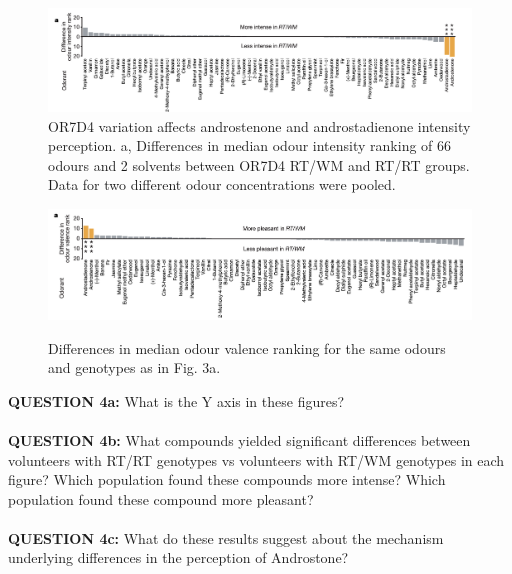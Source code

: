 \documentclass{article}
\begin{document}
\renewcommand{\thefigure}{3a}
\begin{figure}[h]
\hspace*{-3.5cm} 
\includegraphics[scale =.55]{3}\\
\caption{OR7D4 variation affects androstenone and androstadienone intensity perception. a, Differences in median odour intensity ranking of 66 odours and 2 solvents between OR7D4 RT/WM and RT/RT groups. Data for two different odour concentrations were pooled. }
\renewcommand{\thefigure}{4a}
\hspace*{-3.5cm} 
\includegraphics[scale =.55]{5}\\
\caption{Differences in median odour valence ranking for the same odours and genotypes as in Fig. 3a.}
\end{figure}
\vspace{35mm}

\noindent \textbf{QUESTION 4a:} What is the Y axis in these figures?\\
\\
\textbf{QUESTION 4b:} What compounds yielded significant differences between volunteers with RT/RT genotypes vs volunteers with RT/WM genotypes in each figure? Which population found these compounds more intense? Which population found these compound more pleasant?\\
\\
\textbf{QUESTION 4c:} What do these results suggest about the mechanism underlying differences in the perception of Androstone?
\end{document}
